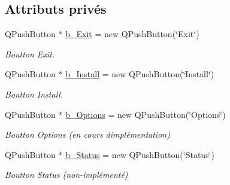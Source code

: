 \subsection*{Attributs privés}
\begin{DoxyCompactItemize}
\item 
\mbox{\label{classmainWindow_aef8ff65705a8c26ed31772b77240e427}} 
Q\+Push\+Button $\ast$ \hyperlink{classmainWindow_aef8ff65705a8c26ed31772b77240e427}{b\+\_\+\+Exit} = new Q\+Push\+Button(\char`\"{}Exit\char`\"{})
\begin{DoxyCompactList}\small\item\em Boutton \textquotesingle{}Exit\textquotesingle{}. \end{DoxyCompactList}\item 
\mbox{\label{classmainWindow_a4de859342d8aacadd86ae77eba5aef17}} 
Q\+Push\+Button $\ast$ \hyperlink{classmainWindow_a4de859342d8aacadd86ae77eba5aef17}{b\+\_\+\+Install} = new Q\+Push\+Button(\char`\"{}Install\char`\"{})
\begin{DoxyCompactList}\small\item\em Boutton \textquotesingle{}Install\textquotesingle{}. \end{DoxyCompactList}\item 
\mbox{\label{classmainWindow_a0e1b4c13ddb95bd6b17ab03a0039489a}} 
Q\+Push\+Button $\ast$ \hyperlink{classmainWindow_a0e1b4c13ddb95bd6b17ab03a0039489a}{b\+\_\+\+Options} = new Q\+Push\+Button(\char`\"{}Options\char`\"{})
\begin{DoxyCompactList}\small\item\em Boutton \textquotesingle{}Options\textquotesingle{} (en cours d\textquotesingle{}implémentation) \end{DoxyCompactList}\item 
\mbox{\label{classmainWindow_ad65a00ab1683cb5c52531cb6842641d4}} 
Q\+Push\+Button $\ast$ \hyperlink{classmainWindow_ad65a00ab1683cb5c52531cb6842641d4}{b\+\_\+\+Status} = new Q\+Push\+Button(\char`\"{}Status\char`\"{})
\begin{DoxyCompactList}\small\item\em Boutton \textquotesingle{}Status\textquotesingle{} (non-\/implémenté) \end{DoxyCompactList}\item 

\end{DoxyCompactItemize}
